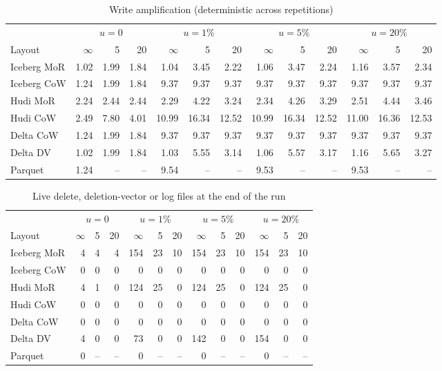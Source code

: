 \begin{table}[!t]\centering
\caption{Write amplification (deterministic across repetitions)}\label{tab:a-wa}
\footnotesize
\begin{tabular}{@{}lrrrrrrrrrrrr@{}}\toprule
 & \multicolumn{3}{c}{$u=0$} & \multicolumn{3}{c}{$u=1\%$} & \multicolumn{3}{c}{$u=5\%$} & \multicolumn{3}{c}{$u=20\%$}\\
\cmidrule(lr){2-4}\cmidrule(lr){5-7}\cmidrule(lr){8-10}\cmidrule(lr){11-13}
Layout & $\infty$ & 5 & 20 & $\infty$ & 5 & 20 & $\infty$ & 5 & 20 & $\infty$ & 5 & 20\\\midrule
Iceberg MoR & 1.02 & 1.99 & 1.84 & 1.04 & 3.45 & 2.22 & 1.06 & 3.47 & 2.24 & 1.16 & 3.57 & 2.34\\
Iceberg CoW & 1.24 & 1.99 & 1.84 & 9.37 & 9.37 & 9.37 & 9.37 & 9.37 & 9.37 & 9.37 & 9.37 & 9.37\\
Hudi MoR & 2.24 & 2.44 & 2.44 & 2.29 & 4.22 & 3.24 & 2.34 & 4.26 & 3.29 & 2.51 & 4.44 & 3.46\\
Hudi CoW & 2.49 & 7.80 & 4.01 & 10.99 & 16.34 & 12.52 & 10.99 & 16.34 & 12.52 & 11.00 & 16.36 & 12.53\\
Delta CoW & 1.24 & 1.99 & 1.84 & 9.37 & 9.37 & 9.37 & 9.37 & 9.37 & 9.37 & 9.37 & 9.37 & 9.37\\
Delta DV & 1.02 & 1.99 & 1.84 & 1.03 & 5.55 & 3.14 & 1.06 & 5.57 & 3.17 & 1.16 & 5.65 & 3.27\\
Parquet & 1.24 & -- & -- & 9.54 & -- & -- & 9.53 & -- & -- & 9.53 & -- & --\\\bottomrule
\end{tabular}
\end{table}

\begin{table}[!t]\centering
\caption{Live delete, deletion-vector or log files at the end of the run}\label{tab:a-del}
\footnotesize
\begin{tabular}{@{}lrrrrrrrrrrrr@{}}\toprule
 & \multicolumn{3}{c}{$u=0$} & \multicolumn{3}{c}{$u=1\%$} & \multicolumn{3}{c}{$u=5\%$} & \multicolumn{3}{c}{$u=20\%$}\\
\cmidrule(lr){2-4}\cmidrule(lr){5-7}\cmidrule(lr){8-10}\cmidrule(lr){11-13}
Layout & $\infty$ & 5 & 20 & $\infty$ & 5 & 20 & $\infty$ & 5 & 20 & $\infty$ & 5 & 20\\\midrule
Iceberg MoR & 4 & 4 & 4 & 154 & 23 & 10 & 154 & 23 & 10 & 154 & 23 & 10\\
Iceberg CoW & 0 & 0 & 0 & 0 & 0 & 0 & 0 & 0 & 0 & 0 & 0 & 0\\
Hudi MoR & 4 & 1 & 0 & 124 & 25 & 0 & 124 & 25 & 0 & 124 & 25 & 0\\
Hudi CoW & 0 & 0 & 0 & 0 & 0 & 0 & 0 & 0 & 0 & 0 & 0 & 0\\
Delta CoW & 0 & 0 & 0 & 0 & 0 & 0 & 0 & 0 & 0 & 0 & 0 & 0\\
Delta DV & 4 & 0 & 0 & 73 & 0 & 0 & 142 & 0 & 0 & 154 & 0 & 0\\
Parquet & 0 & -- & -- & 0 & -- & -- & 0 & -- & -- & 0 & -- & --\\\bottomrule
\end{tabular}
\end{table}

